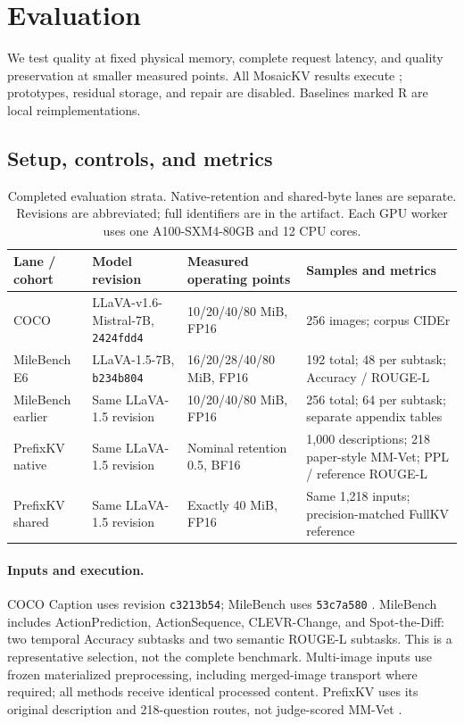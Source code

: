 \section{Evaluation}
\label{sec:evaluation}
We test quality at fixed physical memory, complete request latency, and quality
preservation at smaller measured points. All MosaicKV results execute
\mexact; prototypes, residual storage, and repair are disabled. Baselines
marked R are local reimplementations.

\subsection{Setup, controls, and metrics}
\begin{table}[t]
\caption{Completed evaluation strata. Native-retention and shared-byte lanes
are separate. Revisions are abbreviated; full identifiers are in the artifact.
Each GPU worker uses one A100-SXM4-80GB and 12 CPU cores.}
\label{tab:completed-setup}
\centering\small
\begin{tabularx}{\textwidth}{P{2.2cm}P{3.3cm}P{3.2cm}Y}
\toprule
Lane / cohort & Model revision & Measured operating points & Samples and metrics\\\midrule
COCO & LLaVA-v1.6-Mistral-7B, \texttt{2424fdd4} & 10/20/40/80 MiB, FP16 & 256 images; corpus CIDEr\\
MileBench E6 & LLaVA-1.5-7B, \texttt{b234b804} & 16/20/28/40/80 MiB, FP16 & 192 total; 48 per subtask; Accuracy / ROUGE-L\\
MileBench earlier & Same LLaVA-1.5 revision & 10/20/40/80 MiB, FP16 & 256 total; 64 per subtask; separate appendix tables\\
PrefixKV native & Same LLaVA-1.5 revision & Nominal retention 0.5, BF16 & 1,000 descriptions; 218 paper-style MM-Vet; PPL / reference ROUGE-L\\
PrefixKV shared & Same LLaVA-1.5 revision & Exactly 40 MiB, FP16 & Same 1,218 inputs; precision-matched FullKV reference\\
\bottomrule
\end{tabularx}
\end{table}

\paragraph{Inputs and execution.}
COCO Caption uses revision \texttt{c3213b54}; MileBench uses
\texttt{53c7a580} \citep{lin2014coco,song2024milebench}. MileBench includes
ActionPrediction, ActionSequence, CLEVR-Change, and Spot-the-Diff: two temporal
Accuracy subtasks and two semantic ROUGE-L subtasks. This is a representative
selection, not the complete benchmark. Multi-image inputs use frozen
materialized preprocessing, including merged-image transport where required;
all methods receive identical processed content. PrefixKV uses its original
description and 218-question routes, not judge-scored MM-Vet
\citep{wang2025prefixkv,yu2023mmvet}.

